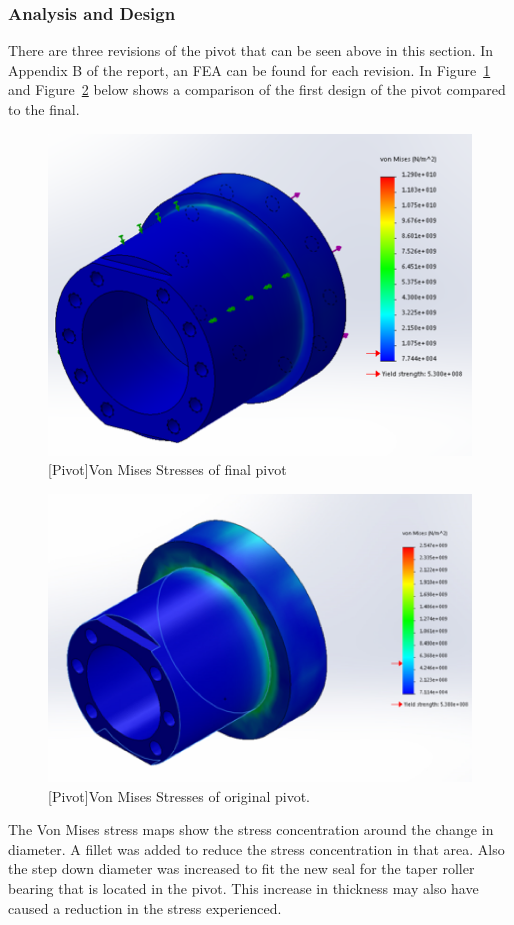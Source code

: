 \subsubsection{Analysis and Design}

There are three revisions of the pivot that can be seen above in this section. In Appendix B of the report, an FEA can be found for each revision. In Figure~\ref{fig:FEA_pivotfinal} and Figure~\ref{fig:FEA_pivotold} below shows a comparison of the first design of the pivot compared to the final.

\begin{figure}[htbp]
\centering
\includegraphics[height=0.3\textheight]{./images/FEA_pivotfinal}
[Pivot]{Von Mises Stresses of final pivot}
\label{fig:FEA_pivotfinal}
\end{figure}

\begin{figure}[htbp]
\centering
\includegraphics[height=0.3\textheight]{./images/FEA_pivotold}
[Pivot]{Von Mises Stresses of original  pivot.}
\label{fig:FEA_pivotold}
\end{figure}

The Von Mises stress maps show the stress concentration around the change in diameter. A fillet was added to reduce the stress concentration in that area. Also the step down diameter was increased to fit the new seal for the taper roller bearing that is located in the pivot. This increase in thickness may also have caused a reduction in the stress experienced.


